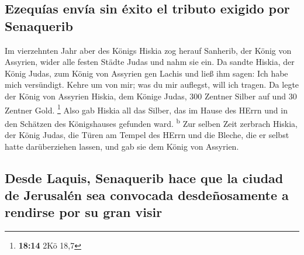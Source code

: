 \hypertarget{ezequuxedas-envuxeda-sin-uxe9xito-el-tributo-exigido-por-senaquerib}{%
\subsection{Ezequías envía sin éxito el tributo exigido por
Senaquerib}\label{ezequuxedas-envuxeda-sin-uxe9xito-el-tributo-exigido-por-senaquerib}}

 Im vierzehnten Jahr aber des Königs Hiskia zog herauf
Sanherib, der König von Assyrien, wider alle festen Städte Judas und
nahm sie ein.  Da sandte Hiskia, der König Judas, zum
König von Assyrien gen Lachis und ließ ihm sagen: Ich habe mich
versündigt. Kehre um von mir; was du mir auflegst, will ich tragen. Da
legte der König von Assyrien Hiskia, dem Könige Judas, 300 Zentner
Silber auf und 30 Zentner Gold. \footnote{\textbf{18:14} 2Kö 18,7}
 Also gab Hiskia all das Silber, das im Hause des HErrn
und in den Schätzen des Königshauses gefunden ward. \textsuperscript{b}
 Zur selben Zeit zerbrach Hiskia, der König Judas, die
Türen am Tempel des HErrn und die Bleche, die er selbst hatte
darüberziehen lassen, und gab sie dem König von Assyrien.

\hypertarget{desde-laquis-senaquerib-hace-que-la-ciudad-de-jerusaluxe9n-sea-convocada-desdeuxf1osamente-a-rendirse-por-su-gran-visir}{%
\subsection{Desde Laquis, Senaquerib hace que la ciudad de Jerusalén sea
convocada desdeñosamente a rendirse por su gran
visir}\label{desde-laquis-senaquerib-hace-que-la-ciudad-de-jerusaluxe9n-sea-convocada-desdeuxf1osamente-a-rendirse-por-su-gran-visir}}

